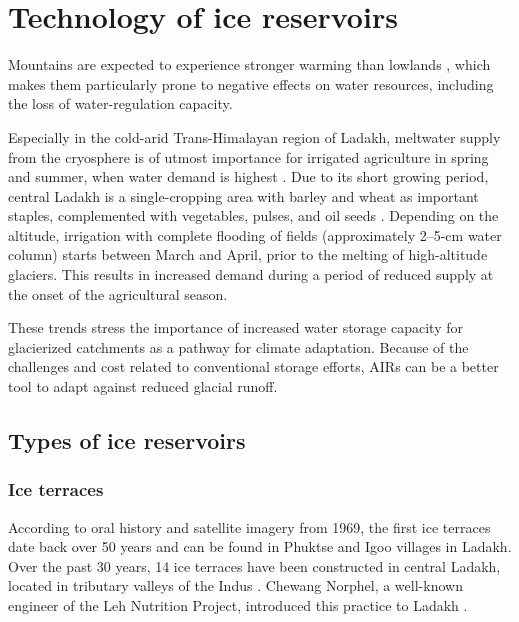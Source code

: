 \chapter{Technology of ice reservoirs}
\label{chap:tech}


Mountains are expected to experience stronger warming than lowlands
\citep{ragettliContrastingClimateChange2016}, which makes them particularly prone to negative effects on
water resources, including the loss of water-regulation capacity.

Especially in the cold-arid Trans-Himalayan region of Ladakh, meltwater supply from the cryosphere is of utmost
importance for irrigated agriculture in spring and summer, when water demand is highest
\citep{nusserCryosphereFedIrrigationNetworks2019}. Due to its short growing period, central Ladakh is a
single-cropping area with barley and wheat as important staples, complemented with vegetables, pulses, and oil
seeds \citep{nusserSociohydrologyArtificialGlaciers2019}. Depending on the altitude, irrigation with complete
flooding of fields (approximately 2–5-cm water column) starts between March and April, prior to the melting of
high-altitude glaciers. This results in increased demand during a period of reduced supply at the onset of the
agricultural season.

These trends stress the importance of increased water storage capacity for glacierized catchments as a pathway
for climate adaptation. Because of the challenges and cost related to conventional storage efforts, \ac{AIRs} can be
a better tool to adapt against reduced glacial runoff. 

\section{Types of ice reservoirs}

\subsection{Ice terraces}

According to oral history and satellite imagery from 1969, the first ice terraces date back over 50 years and can
be found in Phuktse and Igoo villages in Ladakh. Over the past 30 years, 14 ice terraces have been constructed in central Ladakh,
located in tributary valleys of the Indus \citep{norphelArtificialGlacierHigh2009,
	nusserSociohydrologyArtificialGlaciers2019}. Chewang Norphel, a well-known engineer of the Leh Nutrition
Project, introduced this practice to Ladakh \citep{vinceGlacierMan2009}.

